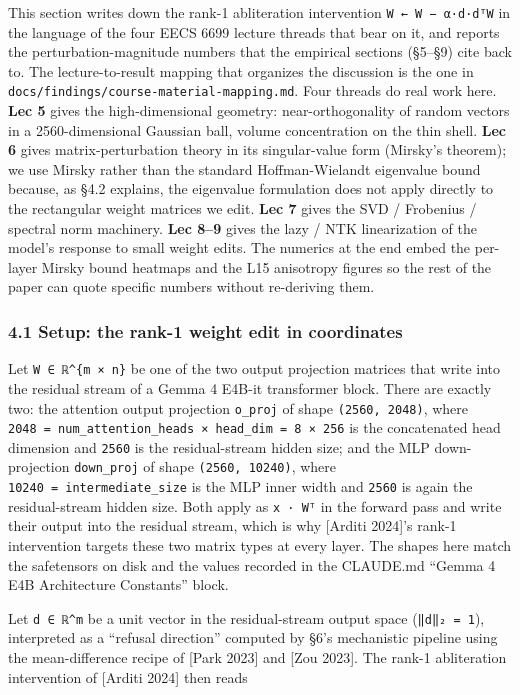 \documentclass[
  11pt,
]{article}
\begin{document}
This section writes down the rank-1 abliteration intervention
\texttt{W\ ←\ W\ −\ α·d·dᵀW} in the language of the four EECS 6699
lecture threads that bear on it, and reports the perturbation-magnitude
numbers that the empirical sections (§5--§9) cite back to. The
lecture-to-result mapping that organizes the discussion is the one in
\texttt{docs/findings/course-material-mapping.md}. Four threads do real
work here. \textbf{Lec 5} gives the high-dimensional geometry:
near-orthogonality of random vectors in a 2560-dimensional Gaussian
ball, volume concentration on the thin shell. \textbf{Lec 6} gives
matrix-perturbation theory in its singular-value form (Mirsky's
theorem); we use Mirsky rather than the standard Hoffman-Wielandt
eigenvalue bound because, as §4.2 explains, the eigenvalue formulation
does not apply directly to the rectangular weight matrices we edit.
\textbf{Lec 7} gives the SVD / Frobenius / spectral norm machinery.
\textbf{Lec 8--9} gives the lazy / NTK linearization of the model's
response to small weight edits. The numerics at the end embed the
per-layer Mirsky bound heatmaps and the L15 anisotropy figures so the
rest of the paper can quote specific numbers without re-deriving them.

\subsubsection{4.1 Setup: the rank-1 weight edit in
coordinates}\label{setup-the-rank-1-weight-edit-in-coordinates}

Let \texttt{W\ ∈\ ℝ\^{}\{m\ ×\ n\}} be one of the two output projection
matrices that write into the residual stream of a Gemma 4 E4B-it
transformer block. There are exactly two: the attention output
projection \texttt{o\_proj} of shape \texttt{(2560,\ 2048)}, where
\texttt{2048\ =\ num\_attention\_heads\ ×\ head\_dim\ =\ 8\ ×\ 256} is
the concatenated head dimension and \texttt{2560} is the residual-stream
hidden size; and the MLP down-projection \texttt{down\_proj} of shape
\texttt{(2560,\ 10240)}, where \texttt{10240\ =\ intermediate\_size} is
the MLP inner width and \texttt{2560} is again the residual-stream
hidden size. Both apply as \texttt{x\ ·\ Wᵀ} in the forward pass and
write their output into the residual stream, which is why {[}Arditi
2024{]}'s rank-1 intervention targets these two matrix types at every
layer. The shapes here match the safetensors on disk and the values
recorded in the CLAUDE.md ``Gemma 4 E4B Architecture Constants'' block.

Let \texttt{d\ ∈\ ℝ\^{}m} be a unit vector in the residual-stream output
space (\texttt{‖d‖₂\ =\ 1}), interpreted as a ``refusal direction''
computed by §6's mechanistic pipeline using the mean-difference recipe
of {[}Park 2023{]} and {[}Zou 2023{]}. The rank-1 abliteration
intervention of {[}Arditi 2024{]} then reads
\end{document}
